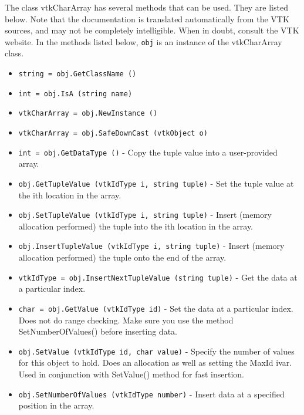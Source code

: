 The class vtkCharArray has several methods that can be used.
  They are listed below.
Note that the documentation is translated automatically from the VTK sources,
and may not be completely intelligible.  When in doubt, consult the VTK website.
In the methods listed below, \verb|obj| is an instance of the vtkCharArray class.
\begin{itemize}
\item  \verb|string = obj.GetClassName ()|

\item  \verb|int = obj.IsA (string name)|

\item  \verb|vtkCharArray = obj.NewInstance ()|

\item  \verb|vtkCharArray = obj.SafeDownCast (vtkObject o)|

\item  \verb|int = obj.GetDataType ()| -  Copy the tuple value into a user-provided array.

\item  \verb|obj.GetTupleValue (vtkIdType i, string tuple)| -  Set the tuple value at the ith location in the array.

\item  \verb|obj.SetTupleValue (vtkIdType i, string tuple)| -  Insert (memory allocation performed) the tuple into the ith location
 in the array.

\item  \verb|obj.InsertTupleValue (vtkIdType i, string tuple)| -  Insert (memory allocation performed) the tuple onto the end of the array.

\item  \verb|vtkIdType = obj.InsertNextTupleValue (string tuple)| -  Get the data at a particular index.

\item  \verb|char = obj.GetValue (vtkIdType id)| -  Set the data at a particular index. Does not do range checking. Make sure
 you use the method SetNumberOfValues() before inserting data.

\item  \verb|obj.SetValue (vtkIdType id, char value)| -  Specify the number of values for this object to hold. Does an
 allocation as well as setting the MaxId ivar. Used in conjunction with
 SetValue() method for fast insertion.

\item  \verb|obj.SetNumberOfValues (vtkIdType number)| -  Insert data at a specified position in the array.


\end{itemize}
